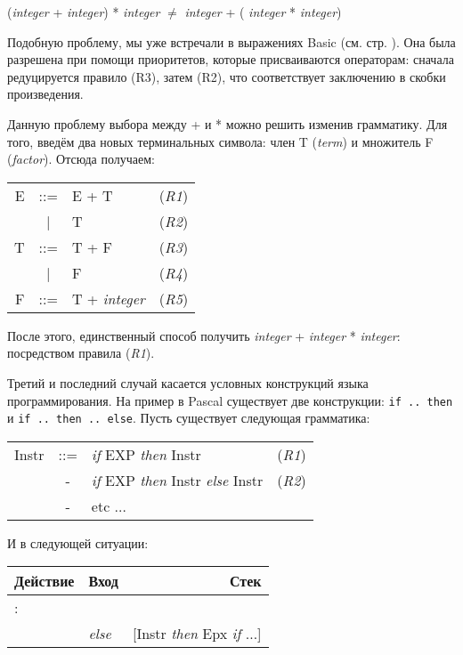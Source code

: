 ({\it integer} + {\it integer}) * {\it integer} $\neq$ {\it integer} + ({\it
integer} * {\it integer})

Подобную проблему, мы уже встречали в выражениях Basic (см. стр. \pageref{??}).
Она была разрешена при помощи приоритетов, которые присваиваются операторам:
сначала редуцируется правило (R3), затем (R2), что соответствует заключению в
скобки произведения.

Данную проблему выбора между + и * можно решить изменив грамматику. Для того,
введём два новых терминальных символа: член T ({\it term}) и множитель F
({\it factor}). Отсюда получаем:

\begin{center}
	\begin{tabular}{rclc}
		E & ::= & E + T & ({\it R1})\\
		 & | & T & ({\it R2}) \\
		T & ::= & T + F & ({\it R3})\\
		 & | & F & ({\it R4}) \\
		F & ::= & T + {\it integer} & ({\it R5})\\
	\end{tabular}
\end{center}

После этого, единственный способ получить {\it integer} + {\it integer} *
{\it integer}: посредством правила ({\it R1}).

Третий и последний случай касается условных конструкций языка программирования.
На пример в Pascal существует две конструкции: \texttt{if .. then} и \texttt{if
.. then .. else}. Пусть существует следующая грамматика:

\begin{center}
	\begin{tabular}{rclc}
		Instr & ::= & {\it if} EXP {\it then} Instr & ({\it R1})\\
		 & - & {\it if} EXP {\it then} Instr {\it else} Instr & ({\it R2}) \\
		 & - & etc $\ldots$ & \\
	\end{tabular}
\end{center}

И в следующей ситуации:

\begin{table}[hс]
	\begin{center}
	\begin{tabular}{|l|l|r|}
	\hline
	Действие  & Вход & Стек \\
	\hline
	: & & \\
	\hline
	& {\it else} & [Instr {\it then} Epx {\it if} $\ldots$] \\
	\hline
	\end{tabular}
	\end{center}
\end{table}

